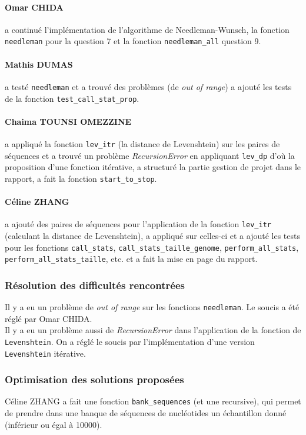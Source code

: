 \paragraph*{Omar CHIDA} a continué l'implémentation de l'algorithme de Needleman-Wunsch, la fonction \texttt{needleman} pour la question 7 et la fonction \texttt{needleman\_all} question 9.

\paragraph*{Mathis DUMAS} a testé \texttt{needleman} et a trouvé des problèmes (de \textsl{out of range}) a ajouté les tests de la fonction \texttt{test\_call\_stat\_prop}.

\paragraph*{Chaima TOUNSI OMEZZINE} a appliqué la fonction \texttt{lev\_itr} (la distance de Levenshtein) sur les paires de séquences et a trouvé un problème \textsl{RecursionError} en appliquant \texttt{lev\_dp} d'où la proposition d'une fonction itérative, a structuré la partie gestion de projet dans le rapport, a fait la fonction \texttt{start\_to\_stop}.

\paragraph*{Céline ZHANG} a ajouté des paires de séquences pour l'application de la fonction \texttt{lev\_itr} (calculant la distance de Levenshtein), a appliqué sur celles-ci et a ajouté les tests pour les fonctions \texttt{call\_stats}, \texttt{call\_stats\_taille\_genome}, \texttt{perform\_all\_stats}, \texttt{perform\_all\_stats\_taille}, etc. et a fait la mise en page du rapport.

\subsubsection*{Résolution des difficultés rencontrées}
Il y a eu un problème de \textsl{out of range} sur les fonctions \texttt{needleman}. Le soucis a été réglé par Omar CHIDA.\\
Il y a eu un problème aussi de \textsl{RecursionError} dans l'application de la fonction de \texttt{Levenshtein}. On a réglé le soucis par l'implémentation d'une version \texttt{Levenshtein} itérative.

\subsubsection*{Optimisation des solutions proposées}
Céline ZHANG a fait une fonction \texttt{bank\_sequences} (et une recursive), qui permet de prendre dans une banque de séquences de nucléotides un échantillon donné (inférieur ou égal à 10000).


